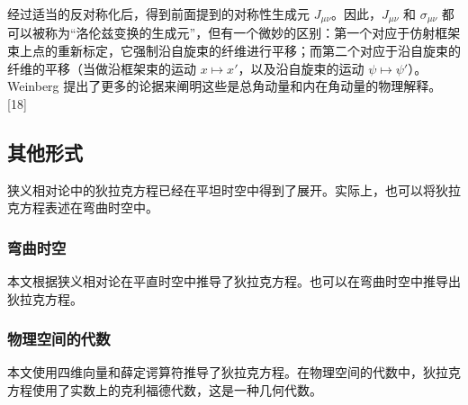 经过适当的反对称化后，得到前面提到的对称性生成元 \( J_{\mu \nu} \)。因此，\( J_{\mu \nu} \) 和 \( \sigma_{\mu \nu} \) 都可以被称为“洛伦兹变换的生成元”，但有一个微妙的区别：第一个对应于仿射框架束上点的重新标定，它强制沿自旋束的纤维进行平移；而第二个对应于沿自旋束的纤维的平移（当做沿框架束的运动 \( x \mapsto x' \)，以及沿自旋束的运动 \( \psi \mapsto \psi' \)）。Weinberg 提出了更多的论据来阐明这些是总角动量和内在角动量的物理解释。[18]
\subsection{其他形式}
狭义相对论中的狄拉克方程已经在平坦时空中得到了展开。实际上，也可以将狄拉克方程表述在弯曲时空中。
\subsubsection{弯曲时空}
本文根据狭义相对论在平直时空中推导了狄拉克方程。也可以在弯曲时空中推导出狄拉克方程。
\subsubsection{物理空间的代数}
本文使用四维向量和薛定谔算符推导了狄拉克方程。在物理空间的代数中，狄拉克方程使用了实数上的克利福德代数，这是一种几何代数。
